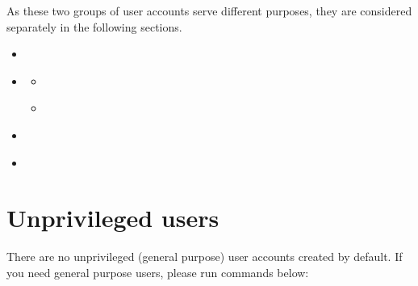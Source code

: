 \documentclass[letterpaper,10pt,english]{sphinxmanual}
\begin{document}
As these two groups of user accounts serve different purposes, they are
considered separately in the following sections.

\begin{sphinxShadowBox}
\begin{itemize}
\item {} 
\label{\detokenize{users:id6}}{\hyperref[\detokenize{users:users-unprivileged-users}]{}}

\item {} 
\label{\detokenize{users:id7}}{\hyperref[\detokenize{users:users-system-users}]{}}
\begin{itemize}
\item {} 
\label{\detokenize{users:id8}}{\hyperref[\detokenize{users:yaml-object-format}]{}}

\item {} 
\label{\detokenize{users:id9}}{\hyperref[\detokenize{users:password-rotation-policies-and-timing}]{}}

\end{itemize}

\item {} 
\label{\detokenize{users:id10}}{\hyperref[\detokenize{users:users-development-mode}]{}}

\item {} 
\label{\detokenize{users:id11}}{\hyperref[\detokenize{users:users-internal-authentication-key}]{}}

\end{itemize}
\end{sphinxShadowBox}


\section{Unprivileged users}
\label{\detokenize{users:users-unprivileged-users}}\label{\detokenize{users:id2}}
There are no unprivileged (general purpose) user accounts created by
default. If you need general purpose users, please run commands below:
\end{document}
